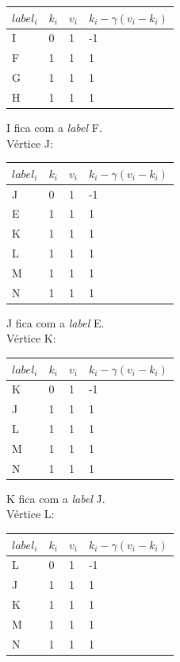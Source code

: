 \documentclass[a4paper,10pt]{report}
\begin{document}
  \begin{tabular}{| l | l | l | l |}
  \hline
  $label_i$ & $k_i$ & $v_i$ & $k_i - \gamma(v_i - k_i)$\\ \hline
  I & 0 & 1 & -1 \\ \hline
  F & 1 & 1 & 1  \\ \hline
  G & 1 & 1 & 1  \\ \hline
  H & 1 & 1 & 1  \\ \hline
  \end{tabular}  
  I fica com a \textit{label} F.
\\[0.25cm]
Vértice J:
  \begin{tabular}{| l | l | l | l |}
  \hline
  $label_i$ & $k_i$ & $v_i$ & $k_i - \gamma(v_i - k_i)$\\ \hline
  J & 0 & 1 & -1 \\ \hline
  E & 1 & 1 & 1  \\ \hline
  K & 1 & 1 & 1  \\ \hline
  L & 1 & 1 & 1  \\ \hline
  M & 1 & 1 & 1  \\ \hline
  N & 1 & 1 & 1  \\ \hline
  \end{tabular}  
  J fica com a \textit{label} E.
\\[0.25cm]
Vértice K:
  \begin{tabular}{| l | l | l | l |}
  \hline
  $label_i$ & $k_i$ & $v_i$ & $k_i - \gamma(v_i - k_i)$\\ \hline
  K & 0 & 1 & -1 \\ \hline
  J & 1 & 1 & 1  \\ \hline
  L & 1 & 1 & 1  \\ \hline
  M & 1 & 1 & 1  \\ \hline
  N & 1 & 1 & 1  \\ \hline
  \end{tabular}  
  K fica com a \textit{label} J.
\\[0.25cm]
Vértice L:
  \begin{tabular}{| l | l | l | l |}
  \hline
  $label_i$ & $k_i$ & $v_i$ & $k_i - \gamma(v_i - k_i)$\\ \hline
  L & 0 & 1 & -1 \\ \hline
  J & 1 & 1 & 1  \\ \hline
  K & 1 & 1 & 1  \\ \hline
  M & 1 & 1 & 1  \\ \hline
  N & 1 & 1 & 1  \\ \hline
  \end{tabular}  
\end{document}
